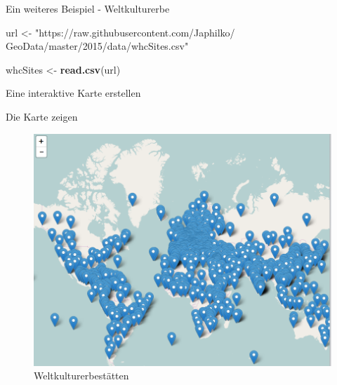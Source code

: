 \documentclass[ignorenonframetext,]{beamer}
\newenvironment{Shaded}{\begin{snugshade}}{\end{snugshade}}
\newcommand{\CommentTok}[1]{\textcolor[rgb]{0.00,0.40,1.00}{\textbf{\textit{#1}}}}
\newcommand{\DataTypeTok}[1]{\textcolor[rgb]{0.74,0.68,0.62}{\underline{#1}}}
\newcommand{\KeywordTok}[1]{\textcolor[rgb]{0.26,0.66,0.93}{\textbf{#1}}}
\newcommand{\NormalTok}[1]{\textcolor[rgb]{0.74,0.68,0.62}{#1}}
\newcommand{\OperatorTok}[1]{\textcolor[rgb]{0.74,0.68,0.62}{#1}}
\newcommand{\StringTok}[1]{\textcolor[rgb]{0.02,0.61,0.04}{#1}}
\begin{document}
\begin{frame}[fragile]{Ein weiteres Beispiel - Weltkulturerbe}
\protect\hypertarget{ein-weiteres-beispiel---weltkulturerbe}{}

\begin{Shaded}
\begin{Highlighting}[]
\NormalTok{url <-}\StringTok{ "https://raw.githubusercontent.com/Japhilko/}
\StringTok{GeoData/master/2015/data/whcSites.csv"}

\NormalTok{whcSites <-}\StringTok{ }\KeywordTok{read.csv}\NormalTok{(url) }
\end{Highlighting}
\end{Shaded}

\end{frame}

\begin{frame}[fragile]{Eine interaktive Karte erstellen}
\protect\hypertarget{eine-interaktive-karte-erstellen}{}

\begin{Shaded}
\end{Shaded}

\end{frame}

\begin{frame}{Die Karte zeigen}
\protect\hypertarget{die-karte-zeigen}{}

\begin{figure}
\centering
\includegraphics{figure/WHCPopUps.PNG}
\caption{Weltkulturerbestätten}
\end{figure}

\end{frame}
\end{document}
